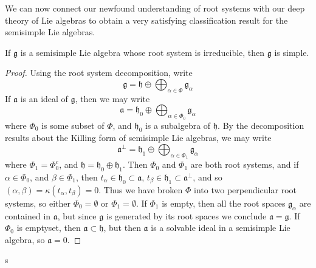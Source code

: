 We can now connect our newfound understanding of root systems with our deep theory of Lie algebras to obtain a very satisfying classification result for the semisimple Lie algebras.

\begin{theorem}
    If $\mathfrak{g}$ is a semisimple Lie algebra whose root system is irreducible, then $\mathfrak{g}$ is simple.
\end{theorem}
\begin{proof}
    Using the root system decomposition, write
    \[ \mathfrak{g} = \mathfrak{h} \oplus \bigoplus_{\alpha \in \Phi} \mathfrak{g}_\alpha \]
    If $\mathfrak{a}$ is an ideal of $\mathfrak{g}$, then we may write
    \[ \mathfrak{a} = \mathfrak{h}_0 \oplus \bigoplus_{\alpha \in \Phi_0} \mathfrak{g}_\alpha \]
    where $\Phi_0$ is some subset of $\Phi$, and $\mathfrak{h}_0$ is a subalgebra of $\mathfrak{h}$. By the decomposition results about the Killing form of semisimple Lie algebras, we may write
    \[ \mathfrak{a}^\perp = \mathfrak{h}_1 \oplus \bigoplus_{\alpha \in \Phi_1} \mathfrak{g}_\alpha \]
    where $\Phi_1 = \Phi_0^c$, and $\mathfrak{h} = \mathfrak{h}_0 \oplus \mathfrak{h}_1$. Then $\Phi_0$ and $\Phi_1$ are both root systems, and if $\alpha \in \Phi_0$, and $\beta \in \Phi_1$, then $t_\alpha \in \mathfrak{h}_0 \subset \mathfrak{a}$, $t_\beta \in \mathfrak{h}_1 \subset \mathfrak{a}^\perp$, and so $(\alpha, \beta) = \kappa(t_\alpha, t_\beta) = 0$. Thus we have broken $\Phi$ into two perpendicular root systems, so either $\Phi_0 = \emptyset$ or $\Phi_1 = \emptyset$. If $\Phi_1$ is empty, then all the root spaces $\mathfrak{g}_\alpha$ are contained in $\mathfrak{a}$, but since $\mathfrak{g}$ is generated by its root spaces we conclude $\mathfrak{a} = \mathfrak{g}$. If $\Phi_0$ is emptyset, then $\mathfrak{a} \subset \mathfrak{h}$, but then $\mathfrak{a}$ is a solvable ideal in a semisimple Lie algebra, so $\mathfrak{a} = 0$.
\end{proof}

\begin{example}
    s
\end{example}





















